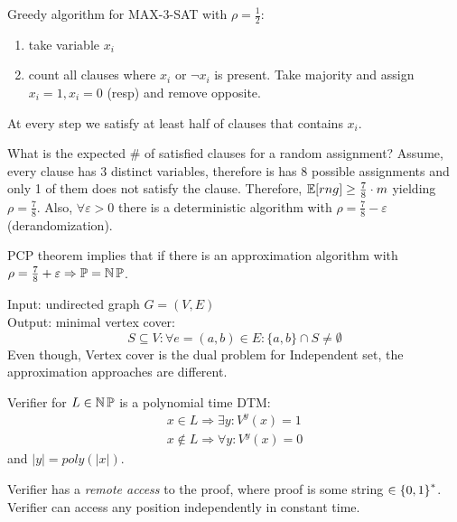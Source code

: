 \begin{exercise}
	Greedy algorithm for MAX-3-SAT with $\rho = \frac{1}{2}$:
	\begin{enumerate}
		\item take variable $x_i$
		\item count all clauses where $x_i$ or $\neg x_i$ is present.
			Take majority and assign $x_i = 1, x_i = 0$ (resp) and remove opposite.
	\end{enumerate}
	At every step we satisfy at least half of clauses that contains $x_i$.

	What is the expected \# of satisfied clauses for a random assignment?
	Assume, every clause has 3 distinct variables, therefore is has 8 possible assignments and only 1 of them does not satisfy the clause.
	Therefore, $\mathbb{E}[rng] \geq \frac{7}{8} \cdot m$ yielding $\rho = \frac{7}{8}$.
	Also, $\forall \varepsilon > 0$ there is a deterministic algorithm with $\rho = \frac{7}{8} - \varepsilon$ (derandomization).

 \end{exercise}

 \begin{note}
	PCP theorem implies that if there is an approximation algorithm with $\rho = \frac{7}{8} + \varepsilon \Rightarrow \operatorname{\mathbb{P}} = \operatorname{\operatorname{\mathbb{N}}\mathbb{P}}$.
 \end{note}

\begin{exercise}
	Input: undirected graph $G = (V, E)$\\
	Output: minimal vertex cover:
	\[ S \subseteq V: \forall e = (a, b) \in E: \{ a, b \} \cap S \ne \emptyset \]
	Even though, Vertex cover is the dual problem for Independent set, the approximation approaches are different.

 \end{exercise}

 \begin{reminder}
	 Verifier for $L \in \operatorname{\operatorname{\mathbb{N}}\mathbb{P}}$ is a polynomial time DTM:
	 \begin{gather*}
	 	x \in L \Rightarrow \exists y: V^y(x) = 1\\
	 	x \notin L \Rightarrow \forall y: V^y(x) = 0
	 \end{gather*}
	 and $|y| = poly(|x|)$.
 \end{reminder}

\begin{definition}
	Verifier has a \emph{remote access} to the proof, where proof is some string $\in \operatorname{\{ 0, 1 \}}^{\ast}$.
	Verifier can access any position independently in constant time.
\end{definition}

